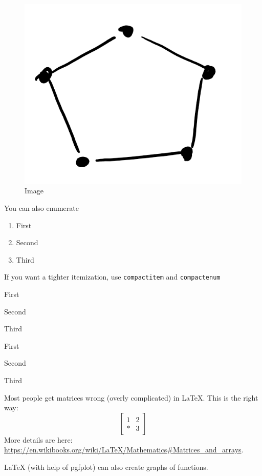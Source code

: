 \documentclass{amsart}
\begin{document}
\begin{figure}
  \includegraphics[width=0.5\linewidth]{figs/graph.png}
  \caption{Image}
\end{figure}
You can also enumerate
\begin{enumerate}
\item First
\item Second
\item Third
\end{enumerate}

If you want a tighter itemization, use \verb|compactitem| and \verb|compactenum|
\begin{compactitem}
\item First
\item Second
\item Third
\end{compactitem}

\begin{compactenum}
\item First
\item Second
\item Third
\end{compactenum}

Most people get matrices wrong (overly complicated) in \LaTeX. This is the right way:
\[ %
  \begin{bmatrix}
    1 & 2 \\
    \ast & 3
  \end{bmatrix}
\]
More details are here:
\url{https://en.wikibooks.org/wiki/LaTeX/Mathematics\#Matrices_and_arrays}.


LaTeX (with help of pgfplot) can also create graphs of functions.
\begin{figure}[htb]\centering
 \end{figure}
\end{document}
